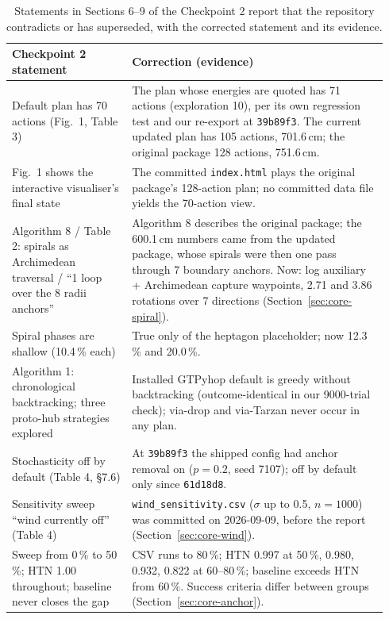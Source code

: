 \begin{table}[htbp]
\centering
\caption{Statements in Sections 6--9 of the Checkpoint 2 report that the repository contradicts or has
superseded, with the corrected statement and its evidence.}\label{tab:core-corrections}
\small
\begin{tabular}{>{\raggedright\arraybackslash}p{0.30\linewidth}>{\raggedright\arraybackslash}p{0.64\linewidth}}
\toprule
Checkpoint 2 statement & Correction (evidence) \\
\midrule
Default plan has 70 actions (Fig.~1, Table 3) & The plan whose energies are quoted has 71 actions (exploration 10), per its own regression test and our re-export at \texttt{39b89f3}. The current updated plan has 105 actions, 701.6\,cm; the original package 128 actions, 751.6\,cm. \\
\addlinespace[3pt]
Fig.~1 shows the interactive visualiser's final state & The committed \texttt{index.html} plays the original package's 128-action plan; no committed data file yields the 70-action view. \\
\addlinespace[3pt]
Algorithm 8 / Table 2: spirals as Archimedean traversal / ``1 loop over the 8 radii anchors'' & Algorithm 8 describes the original package; the 600.1\,cm numbers came from the updated package, whose spirals were then one pass through 7 boundary anchors. Now: log auxiliary + Archimedean capture waypoints, 2.71 and 3.86 rotations over 7 directions (Section~\ref{sec:core-spiral}). \\
\addlinespace[3pt]
Spiral phases are shallow (10.4\,\% each) & True only of the heptagon placeholder; now 12.3\,\% and 20.0\,\%. \\
\addlinespace[3pt]
Algorithm 1: chronological backtracking; three proto-hub strategies explored & Installed GTPyhop default is greedy without backtracking (outcome-identical in our 9000-trial check); via-drop and via-Tarzan never occur in any plan. \\
\addlinespace[3pt]
Stochasticity off by default (Table 4, \S7.6) & At \texttt{39b89f3} the shipped config had anchor removal on ($p=0.2$, seed 7107); off by default only since \texttt{61d18d8}. \\
\addlinespace[3pt]
Sensitivity sweep ``wind currently off'' (Table 4) & \texttt{wind\_sensitivity.csv} ($\sigma$ up to 0.5, $n=1000$) was committed on 2026-09-09, before the report (Section~\ref{sec:core-wind}). \\
\addlinespace[3pt]
Sweep from 0\,\% to 50\,\%; HTN 1.00 throughout; baseline never closes the gap & CSV runs to 80\,\%; HTN 0.997 at 50\,\%, 0.980, 0.932, 0.822 at 60--80\,\%; baseline exceeds HTN from 60\,\%. Success criteria differ between groups (Section~\ref{sec:core-anchor}). \\

\end{tabular}
\end{table}
